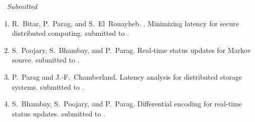 \documentclass[11pt]{article}
\newcommand{\blankline}{\quad\pagebreak[2]}
\begin{document}
\blankline
$\quad${\it Submitted}
\begin{enumerate}
\addtocounter{enumi}{6}


	
\item[{\bf [J09]}] R.~Bitar, P.~Parag, and S.~El~Rouayheb. .
\newblock 	Minimizing latency for secure distributed computing.  
submitted to . %

\item[{\bf [J08]}] S.~Poojary, S.~Bhambay, and P.~Parag. 
\newblock Real-time status updates for Markov source. 
submitted to . %

\item[{\bf [J07]}] P.~Parag and J.-F.~Chamberland.
\newblock Latency analysis for distributed storage systems. 
submitted to . %

\item[{\bf [J06]}] S.~Bhambay, S.~Poojary, and P.~Parag. 
\newblock Differential encoding for real-time status updates. 
submitted to . %

	
\end{enumerate}

\blankline
\end{document}
